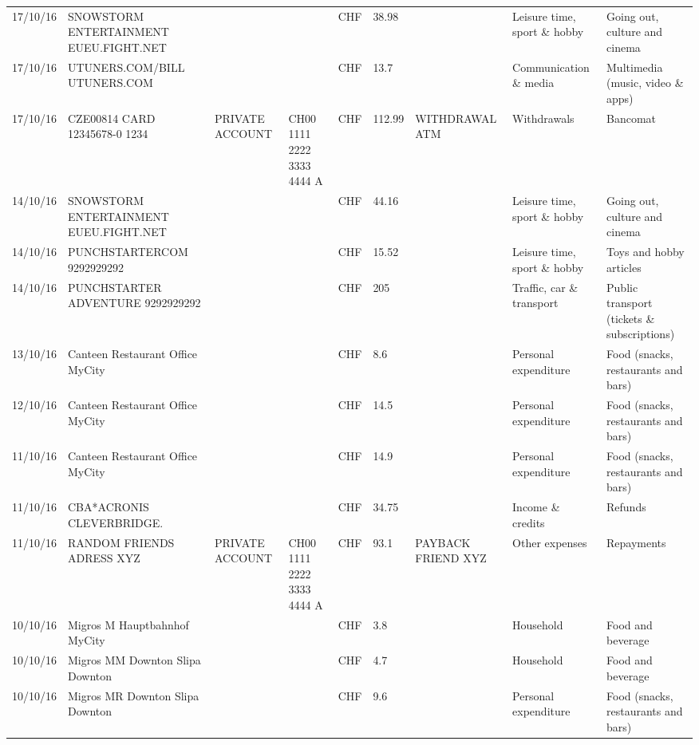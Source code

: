 \begin{landscape}
\begin{table}[t]
\begin{center}
\begin{tabular}{lllllllll}
		17/10/16 & SNOWSTORM ENTERTAINMENT EUEU.FIGHT.NET &       &       & CHF   & 38.98 &       & Leisure time, sport \& hobby & Going out, culture and cinema \\
		17/10/16 & UTUNERS.COM/BILL          UTUNERS.COM &       &       & CHF   & 13.7  &       & Communication \& media & Multimedia (music, video \& apps) \\
		17/10/16 & CZE00814 CARD 12345678-0 1234 & PRIVATE ACCOUNT & CH00 1111 2222 3333 4444 A & CHF   & 112.99 & WITHDRAWAL ATM & Withdrawals & Bancomat \\
		14/10/16 & SNOWSTORM ENTERTAINMENT EUEU.FIGHT.NET &       &       & CHF   & 44.16 &       & Leisure time, sport \& hobby & Going out, culture and cinema \\
		14/10/16 & PUNCHSTARTERCOM           9292929292 &       &       & CHF   & 15.52 &       & Leisure time, sport \& hobby & Toys and hobby articles \\
		14/10/16 & PUNCHSTARTER ADVENTURE    9292929292 &       &       & CHF   & 205   &       & Traffic, car \& transport & Public transport (tickets \& subscriptions) \\
		13/10/16 & Canteen Restaurant Office      MyCity &       &       & CHF   & 8.6   &       & Personal expenditure & Food (snacks, restaurants and bars) \\
		12/10/16 & Canteen Restaurant Office      MyCity &       &       & CHF   & 14.5  &       & Personal expenditure & Food (snacks, restaurants and bars) \\
		11/10/16 & Canteen Restaurant Office      MyCity &       &       & CHF   & 14.9  &       & Personal expenditure & Food (snacks, restaurants and bars) \\
		11/10/16 & CBA*ACRONIS              CLEVERBRIDGE. &       &       & CHF   & 34.75 &       & Income \& credits & Refunds \\
		11/10/16 & RANDOM FRIENDS ADRESS XYZ & PRIVATE ACCOUNT & CH00 1111 2222 3333 4444 A & CHF   & 93.1  & PAYBACK FRIEND XYZ & Other expenses & Repayments \\
		10/10/16 & Migros M Hauptbahnhof    MyCity &       &       & CHF   & 3.8   &       & Household & Food and beverage \\
		10/10/16 & Migros MM Downton Slipa   Downton &       &       & CHF   & 4.7   &       & Household & Food and beverage \\
		10/10/16 & Migros MR Downton Slipa   Downton &       &       & CHF   & 9.6   &       & Personal expenditure & Food (snacks, restaurants and bars) \\

\end{tabular}
\end{center}
\end{table}
\end{landscape}
